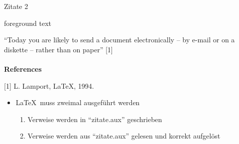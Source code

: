 \documentclass[aspectratio=169]{beamer}
\providecommand{\tightlist}{\setlength{\itemsep}{0pt}\setlength{\parskip}{0pt}}
\newenvironment{Shaded}{\begin{snugshade}}{\end{snugshade}}
\newcommand{\NormalTok}[1]{\textcolor[rgb]{0.19,0.19,0.19}{#1}}
\newenvironment{Shaded}{}{}
\newcommand\citestyle[1]{\textcolor{foreground-secondary}{\textsuperscript{#1}}}
\let\oldautocite\autocite
\renewcommand{\autocite}[1]{\citestyle{\oldautocite{#1}}}
\begin{document}
    \begin{frame}[fragile]{Zitate 2}
    \protect\hypertarget{zitate-2}{}
    \begin{minipage}{0.66\textwidth}

\begin{Shaded}
\end{Shaded}

    \end{minipage}\begin{minipage}{0.33\textwidth}

    \bgroup 
        \begin{OutputBox}
        \begin{beamercolorbox}{foreground text}
            \selectfont%

    ``Today you are likely to send a 
    document electronically -- by e-mail 
    or on a diskette -- 
    rather than on paper'' [1]
    \\ \\
    \textbf{\Large References}

    [1] L. Lamport, \LaTeX, 1994.

            \end{beamercolorbox}
        \end{OutputBox}
    \egroup

    \end{minipage}

    \begin{itemize}
    \tightlist
    \item
      \LaTeX~muss zweimal ausgeführt werden \autocite{overleaf-bibtex}

      \begin{enumerate}
      \tightlist
      \item
        Verweise werden in \enquote{zitate.aux} geschrieben
      \item
        Verweise werden aus \enquote{zitate.aux} gelesen und korrekt
        aufgelöst
      \end{enumerate}
    \end{itemize}
    \end{frame}
\end{document}
